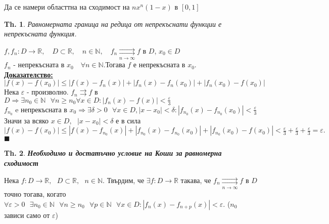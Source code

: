 \documentclass[12pt]{article}
\newcommand{\halfbox}[1]{\rbbox{#1}\quad}
\newtheorem{theorem}{Th.}
\newcommand{\spc}{\text{ }}
\begin{document}
	\halfbox{Задача} Да се намери областтна на сходимост на $nx^n(1-x)$ в $[0,1]$\\
	
	\begin{theorem}
		Равномерната граница на редица от непрекъснати функции е непрекъсната функция.
	\end{theorem}
	$f, f_n : D \rightarrow \mathbb{R}, \quad D\subset\mathbb{R}, \quad n\in\mathbb{N},\quad f_n \underset{n\to\infty}{\rightrightarrows}f$ в $D$, $x_0 \in D$\\
	$f_n$ - непрекъсната в $x_0 \quad \forall n \in \mathbb{N}$.\quad Тогава $f$ е непрекъсната в $x_0$.\\
	
	\textbf{\underline{Доказателство:}}
	$|f(x) - f(x_0)| \leq |f(x)-f_n(x)| + |f_n(x)-f_n(x_0)| + |f_n(x_0) - f(x_0)|$\\
	Нека $\varepsilon$ - произволно. $f_n \rightrightarrows f$ в $D \Rightarrow \boxed{\exists n_0 \in \mathbb{N}}\spc \forall n \geq n_0 \forall x \in D : |f_n(x) - f(x)| < \frac{\varepsilon}{3}$\\
	$f_{n_0}\text{ e непрекъсната в }x_0 \Rightarrow \boxed{\exists\delta>0}\spc\forall x\in D, |x - x_0| < \delta : |f_{n_0}(x) - f_{n_0}(x_0)| < \frac{\varepsilon}{3}$ \\
	Значи за всяко $x\in D, \spc|x - x_0|<\delta$ е в сила $|f(x) - f(x_0)| \leq |f(x) - f_{n_0}(x)| + |f_{n_0}(x) - f_{n_{0}}(x_0)| + |f_{n_0}(x_0) - f(x_0)| < \frac{\varepsilon}{3} + \frac{\varepsilon}{3} + \frac{\varepsilon}{3} = \varepsilon.$ \hfill$\blacksquare$\\
	
	\begin{theorem}
		\textbf{Необходимо и достатъчно условие на Коши за равномерна сходимост}
	\end{theorem}
	Нека $f: D \rightarrow \mathbb{R},\spc D\subset\mathbb{R},\spc n\in\mathbb{N}$. Твърдим, че $\exists f:D\rightarrow\mathbb{R}$ такава, че $f_n\underset{n\to\infty}{\rightrightarrows}f$ в $D$ точно тогава, когато $\forall \varepsilon > 0 \spc\exists n_0 \in \mathbb{N} \spc\forall n \geq n_0 \spc\forall p \in \mathbb{N} \spc\forall x \in D : |f_n(x) - f_{n + p}(x)| < \varepsilon$. ($n_0$ зависи само от $\varepsilon$)\\
	
\end{document}
